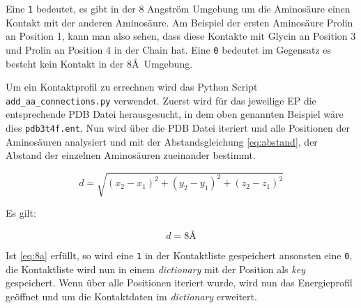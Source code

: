 Eine \texttt{1} bedeutet, es gibt in der 8 Angström Umgebung um die Aminosäure einen Kontakt mit der anderen Aminosäure. Am Beispiel der ersten Aminosäure Prolin an Position 1, kann man also sehen, dass diese Kontakte mit Glycin an Position 3 und Prolin an Position 4 in der Chain hat. Eine \texttt{0} bedeutet im Gegensatz es besteht kein Kontakt in der 8\AA\ Umgebung.

Um ein Kontaktprofil zu errechnen wird das Python Script \texttt{add\_aa\_connections.py} verwendet. Zuerst wird für das jeweilige \ac{EP} die entsprechende \ac{PDB} Datei herausgesucht, in dem oben genannten Beispiel wäre dies \texttt{pdb3t4f.ent}. Nun wird über die \ac{PDB} Datei iteriert und alle Positionen der Aminosäuren analysiert und mit der Abstandsgleichung \ref{eq:abstand}, der Abstand der einzelnen Aminosäuren zueinander bestimmt.

\begin{equation}
    d=\sqrt{(x_2-x_1)^2+(y_2-y_1)^2+(z_2-z_1)^2}
    \label{eq:abstand}
\end{equation}

Es gilt:

\begin{equation}
    d = 8\text{\AA}
    \label{eq:8a}
\end{equation}

Ist \ref{eq:8a} erfüllt, so wird eine \texttt{1} in der Kontaktliste gespeichert ansonsten eine \texttt{0}, die Kontaktliste wird nun in einem \emph{dictionary} mit der Position als \emph{key} gespeichert. Wenn über alle Positionen iteriert wurde, wird nun das Energieprofil geöffnet und um die Kontaktdaten im \emph{dictionary} erweitert.




